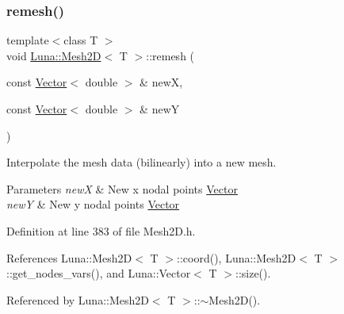 \subsubsection{\texorpdfstring{remesh()}{remesh()}}
{\footnotesize\ttfamily template$<$class T $>$ \\
void \hyperlink{classLuna_1_1Mesh2D}{Luna\+::\+Mesh2D}$<$ T $>$\+::remesh (\begin{DoxyParamCaption}\item[{const \hyperlink{classLuna_1_1Vector}{Vector}$<$ double $>$ \&}]{newX,  }\item[{const \hyperlink{classLuna_1_1Vector}{Vector}$<$ double $>$ \&}]{newY }\end{DoxyParamCaption})}



Interpolate the mesh data (bilinearly) into a new mesh. 


\begin{DoxyParams}{Parameters}
{\em newX} & New x nodal points \hyperlink{classLuna_1_1Vector}{Vector} \\
\hline
{\em newY} & New y nodal points \hyperlink{classLuna_1_1Vector}{Vector} \\
\hline
\end{DoxyParams}


Definition at line 383 of file Mesh2\+D.\+h.



References Luna\+::\+Mesh2\+D$<$ T $>$\+::coord(), Luna\+::\+Mesh2\+D$<$ T $>$\+::get\+\_\+nodes\+\_\+vars(), and Luna\+::\+Vector$<$ T $>$\+::size().



Referenced by Luna\+::\+Mesh2\+D$<$ T $>$\+::$\sim$\+Mesh2\+D().


